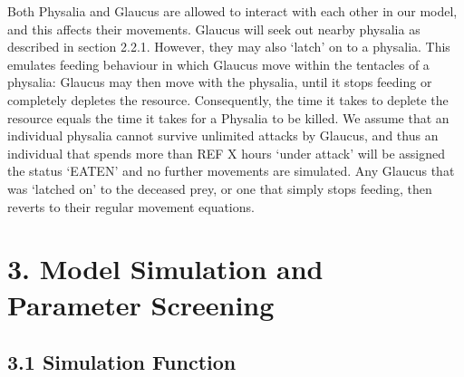 \documentclass[
]{article}
\begin{document}
Both Physalia and Glaucus are allowed to interact with each other in our
model, and this affects their movements. Glaucus will seek out nearby
physalia as described in section 2.2.1. However, they may also `latch'
on to a physalia. This emulates feeding behaviour in which Glaucus move
within the tentacles of a physalia: Glaucus may then move with the
physalia, until it stops feeding or completely depletes the resource.
Consequently, the time it takes to deplete the resource equals the time
it takes for a Physalia to be killed. We assume that an individual
physalia cannot survive unlimited attacks by Glaucus, and thus an
individual that spends more than REF X hours `under attack' will be
assigned the status `EATEN' and no further movements are simulated. Any
Glaucus that was `latched on' to the deceased prey, or one that simply
stops feeding, then reverts to their regular movement equations.

\hypertarget{model-simulation-and-parameter-screening}{%
\section{3. Model Simulation and Parameter
Screening}\label{model-simulation-and-parameter-screening}}

\hypertarget{simulation-function}{%
\subsection{3.1 Simulation Function}\label{simulation-function}}
\end{document}
